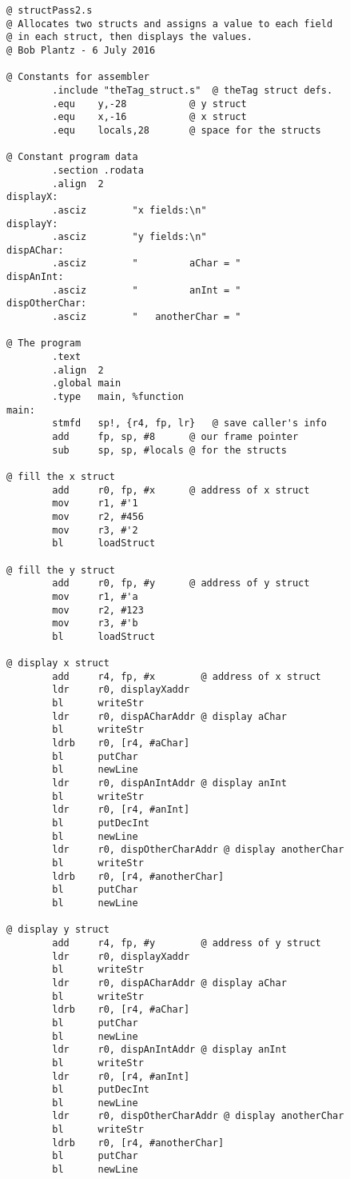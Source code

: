 \documentclass[10pt,]{article}
\theoremstyle{plain}
\theoremstyle{definition}
\theoremstyle{definition}
\theoremstyle{definition}
\theoremstyle{definition}
\theoremstyle{definition}
\theoremstyle{definition}
\numberwithin{equation}{section}
\newenvironment{listing}{\par\bigskip\noindent}{}
\begin{document}
\begin{listing}
\begin{lstlisting}[style=genericinput]
@ structPass2.s
@ Allocates two structs and assigns a value to each field
@ in each struct, then displays the values.
@ Bob Plantz - 6 July 2016

@ Constants for assembler
        .include "theTag_struct.s"  @ theTag struct defs.
        .equ    y,-28           @ y struct
        .equ    x,-16           @ x struct
        .equ    locals,28       @ space for the structs

@ Constant program data
        .section .rodata
        .align  2
displayX:
        .asciz        "x fields:\n"
displayY:
        .asciz        "y fields:\n"
dispAChar:
        .asciz        "         aChar = "
dispAnInt:
        .asciz        "         anInt = "
dispOtherChar:
        .asciz        "   anotherChar = "

@ The program
        .text
        .align  2
        .global main
        .type   main, %function
main:
        stmfd   sp!, {r4, fp, lr}   @ save caller's info
        add     fp, sp, #8      @ our frame pointer
        sub     sp, sp, #locals @ for the structs

@ fill the x struct
        add     r0, fp, #x      @ address of x struct
        mov     r1, #'1
        mov     r2, #456
        mov     r3, #'2
        bl      loadStruct

@ fill the y struct
        add     r0, fp, #y      @ address of y struct
        mov     r1, #'a
        mov     r2, #123
        mov     r3, #'b
        bl      loadStruct

@ display x struct
        add     r4, fp, #x        @ address of x struct
        ldr     r0, displayXaddr
        bl      writeStr
        ldr     r0, dispACharAddr @ display aChar
        bl      writeStr
        ldrb    r0, [r4, #aChar]
        bl      putChar
        bl      newLine
        ldr     r0, dispAnIntAddr @ display anInt
        bl      writeStr
        ldr     r0, [r4, #anInt]
        bl      putDecInt
        bl      newLine
        ldr     r0, dispOtherCharAddr @ display anotherChar
        bl      writeStr
        ldrb    r0, [r4, #anotherChar]
        bl      putChar
        bl      newLine

@ display y struct
        add     r4, fp, #y        @ address of y struct
        ldr     r0, displayXaddr
        bl      writeStr
        ldr     r0, dispACharAddr @ display aChar
        bl      writeStr
        ldrb    r0, [r4, #aChar]
        bl      putChar
        bl      newLine
        ldr     r0, dispAnIntAddr @ display anInt
        bl      writeStr
        ldr     r0, [r4, #anInt]
        bl      putDecInt
        bl      newLine
        ldr     r0, dispOtherCharAddr @ display anotherChar
        bl      writeStr
        ldrb    r0, [r4, #anotherChar]
        bl      putChar
        bl      newLine


\end{lstlisting}
\end{listing}
\end{document}
